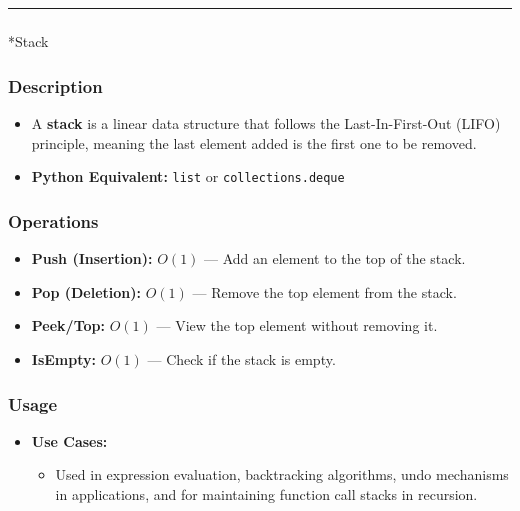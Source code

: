 \documentclass[
  letterpaper,
  DIV=11,
  numbers=noendperiod]{scrreprt}
\makeatletter
\let\oldsubparagraph\subparagraph
\renewcommand{\subparagraph}{
    \@ifstar
      \xxxSubParagraphStar
      \xxxSubParagraphNoStar
  }
\newcommand{\xxxSubParagraphStar}[1]{\oldsubparagraph*{#1}\mbox{}}
\newcommand{\xxxSubParagraphNoStar}[1]{\oldsubparagraph{#1}\mbox{}}
\providecommand{\tightlist}{%
  \setlength{\itemsep}{0pt}\setlength{\parskip}{0pt}}
\makeatother
\begin{document}
\begin{center}\rule{0.5\linewidth}{0.5pt}\end{center}

\subparagraph*{Stack}\label{stack-1}

\subsubsection{Description}

\begin{itemize}
\tightlist
\item
  A \textbf{stack} is a linear data structure that follows the
  Last-In-First-Out (LIFO) principle, meaning the last element added is
  the first one to be removed.
\item
  \textbf{Python Equivalent:} \texttt{list} or
  \texttt{collections.deque}
\end{itemize}

\subsubsection{Operations}

\begin{itemize}
\tightlist
\item
  \textbf{Push (Insertion):} \(O(1)\) --- Add an element to the top of
  the stack.
\item
  \textbf{Pop (Deletion):} \(O(1)\) --- Remove the top element from the
  stack.
\item
  \textbf{Peek/Top:} \(O(1)\) --- View the top element without removing
  it.
\item
  \textbf{IsEmpty:} \(O(1)\) --- Check if the stack is empty.
\end{itemize}

\subsubsection{Usage}

\begin{itemize}
\item
  \textbf{Use Cases:}

  \begin{itemize}
  \tightlist
  \item
    Used in expression evaluation, backtracking algorithms, undo
    mechanisms in applications, and for maintaining function call stacks
    in recursion.
  \end{itemize}
\end{itemize}
\end{document}
